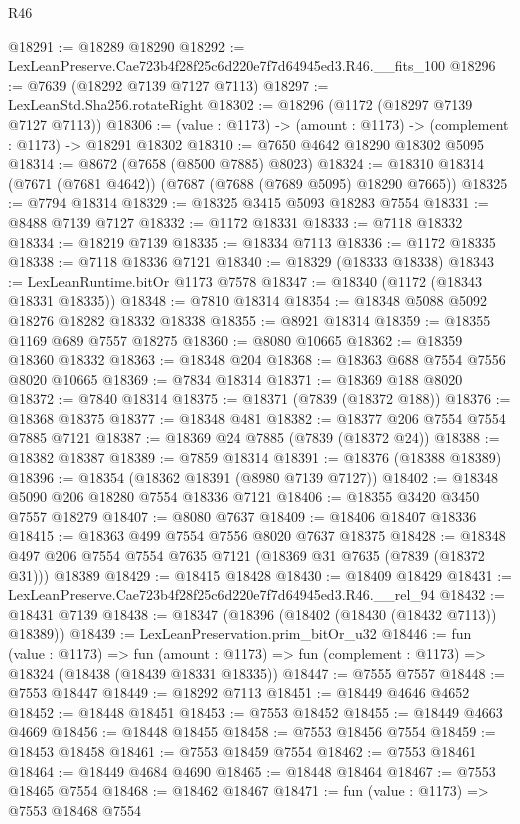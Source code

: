 \begin{lexlean}{R46}
\begin{coremodule}
@18291 := @18289 @18290
@18292 := LexLeanPreserve.Cae723b4f28f25c6d220e7f7d64945ed3.R46.__fits_100
@18296 := @7639 (@18292 @7139 @7127 @7113)
@18297 := LexLeanStd.Sha256.rotateRight
@18302 := @18296 (@1172 (@18297 @7139 @7127 @7113))
@18306 := (value : @1173) -> (amount : @1173) -> (complement : @1173) -> @18291 @18302
@18310 := @7650 @4642 @18290 @18302 @5095
@18314 := @8672 (@7658 (@8500 @7885) @8023)
@18324 := @18310 @18314 (@7671 (@7681 @4642)) (@7687 (@7688 (@7689 @5095) @18290 @7665))
@18325 := @7794 @18314
@18329 := @18325 @3415 @5093 @18283 @7554
@18331 := @8488 @7139 @7127
@18332 := @1172 @18331
@18333 := @7118 @18332
@18334 := @18219 @7139
@18335 := @18334 @7113
@18336 := @1172 @18335
@18338 := @7118 @18336 @7121
@18340 := @18329 (@18333 @18338)
@18343 := LexLeanRuntime.bitOr @1173 @7578
@18347 := @18340 (@1172 (@18343 @18331 @18335))
@18348 := @7810 @18314
@18354 := @18348 @5088 @5092 @18276 @18282 @18332 @18338
@18355 := @8921 @18314
@18359 := @18355 @1169 @689 @7557 @18275
@18360 := @8080 @10665
@18362 := @18359 @18360 @18332
@18363 := @18348 @204
@18368 := @18363 @688 @7554 @7556 @8020 @10665
@18369 := @7834 @18314
@18371 := @18369 @188 @8020
@18372 := @7840 @18314
@18375 := @18371 (@7839 (@18372 @188))
@18376 := @18368 @18375
@18377 := @18348 @481
@18382 := @18377 @206 @7554 @7554 @7885 @7121
@18387 := @18369 @24 @7885 (@7839 (@18372 @24))
@18388 := @18382 @18387
@18389 := @7859 @18314
@18391 := @18376 (@18388 @18389)
@18396 := @18354 (@18362 @18391 (@8980 @7139 @7127))
@18402 := @18348 @5090 @206 @18280 @7554 @18336 @7121
@18406 := @18355 @3420 @3450 @7557 @18279
@18407 := @8080 @7637
@18409 := @18406 @18407 @18336
@18415 := @18363 @499 @7554 @7556 @8020 @7637 @18375
@18428 := @18348 @497 @206 @7554 @7554 @7635 @7121 (@18369 @31 @7635 (@7839 (@18372 @31))) @18389
@18429 := @18415 @18428
@18430 := @18409 @18429
@18431 := LexLeanPreserve.Cae723b4f28f25c6d220e7f7d64945ed3.R46.__rel_94
@18432 := @18431 @7139
@18438 := @18347 (@18396 (@18402 (@18430 (@18432 @7113)) @18389))
@18439 := LexLeanPreservation.prim_bitOr_u32
@18446 := fun (value : @1173) =>
  fun (amount : @1173) => fun (complement : @1173) => @18324 (@18438 (@18439 @18331 @18335))
@18447 := @7555 @7557
@18448 := @7553 @18447
@18449 := @18292 @7113
@18451 := @18449 @4646 @4652
@18452 := @18448 @18451
@18453 := @7553 @18452
@18455 := @18449 @4663 @4669
@18456 := @18448 @18455
@18458 := @7553 @18456 @7554
@18459 := @18453 @18458
@18461 := @7553 @18459 @7554
@18462 := @7553 @18461
@18464 := @18449 @4684 @4690
@18465 := @18448 @18464
@18467 := @7553 @18465 @7554
@18468 := @18462 @18467
@18471 := fun (value : @1173) => @7553 @18468 @7554

\end{coremodule}
\end{lexlean}

